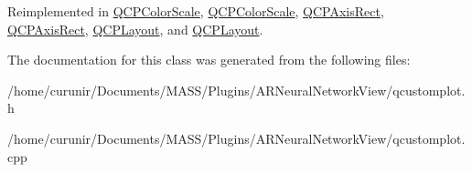 Reimplemented in \hyperlink{class_q_c_p_color_scale_a259dcb6d3053a2cc3c197e9b1191ddbe}{Q\+C\+P\+Color\+Scale}, \hyperlink{class_q_c_p_color_scale_a5bbae1d186440907cc95b1afdcfd0290}{Q\+C\+P\+Color\+Scale}, \hyperlink{class_q_c_p_axis_rect_add049d464b9ef2ccdc638adc4ccb4aca}{Q\+C\+P\+Axis\+Rect}, \hyperlink{class_q_c_p_axis_rect_a8c9f5555c257955648465e8293adb7ef}{Q\+C\+P\+Axis\+Rect}, \hyperlink{class_q_c_p_layout_a48ecc9c98ea90b547c3e27a931a8f7bd}{Q\+C\+P\+Layout}, and \hyperlink{class_q_c_p_layout_a2dd1945e29217de03f27228f596d1304}{Q\+C\+P\+Layout}.



The documentation for this class was generated from the following files\+:\begin{DoxyCompactItemize}
\item 
/home/curunir/\+Documents/\+M\+A\+S\+S/\+Plugins/\+A\+R\+Neural\+Network\+View/qcustomplot.\+h\item 
/home/curunir/\+Documents/\+M\+A\+S\+S/\+Plugins/\+A\+R\+Neural\+Network\+View/qcustomplot.\+cpp\end{DoxyCompactItemize}
